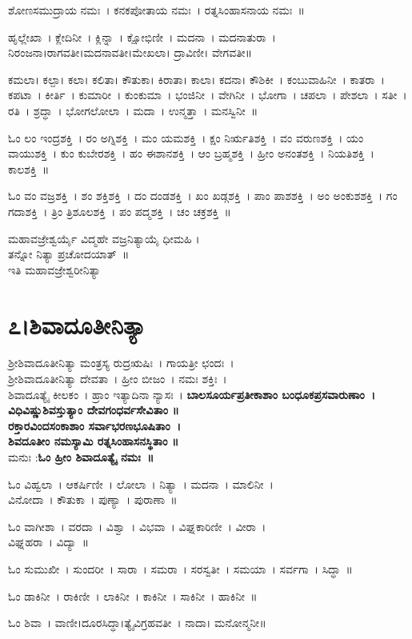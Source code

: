 ಶೋಣಸಮುದ್ರಾಯ ನಮಃ~। ಕನಕಪೋತಾಯ ನಮಃ~। ರತ್ನಸಿಂಹಾಸನಾಯ ನಮಃ~॥

ಹೃಲ್ಲೇಖಾ~। ಕ್ಲೇದಿನೀ~। ಕ್ಲಿನ್ನಾ~। ಕ್ಷೋಭಿಣೀ~। ಮದನಾ~। ಮದನಾತುರಾ~। \\ನಿರಂಜನಾ।ರಾಗವತೀ।ಮದನಾವತೀ।ಮೇಖಲಾ। ದ್ರಾವಿಣೀ। ವೇಗವತೀ॥ 

ಕಮಲಾ। ಕಲ್ಪಾ। ಕಲಾ। ಕಲಿತಾ। ಕೌತುಕಾ। ಕಿರಾತಾ। ಕಾಲಾ। ಕದನಾ। ಕೌಶಿಕೀ~। ಕಂಬುವಾಹಿನೀ~। ಕಾತರಾ~। ಕಪಟಾ~। ಕೀರ್ತಿ~। ಕುಮಾರೀ~। ಕುಂಕುಮಾ~। ಭಂಜಿನೀ~। ವೇಗಿನೀ~। ಭೋಗಾ~। ಚಪಲಾ~। ಪೇಶಲಾ~। ಸತೀ~। ರತಿ~। ಶ್ರದ್ಧಾ~। ಭೋಗಲೋಲಾ~। ಮದಾ~। ಉನ್ಮತ್ತಾ~। ಮನಸ್ವಿನೀ~॥ 

ಓಂ ಲಂ ಇಂದ್ರಶಕ್ತಿ~। ರಂ ಅಗ್ನಿಶಕ್ತಿ~। ಮಂ ಯಮಶಕ್ತಿ~। ಕ್ಷಂ ನಿರ್ಋತಿಶಕ್ತಿ~। ವಂ ವರುಣಶಕ್ತಿ~। ಯಂ ವಾಯುಶಕ್ತಿ~। ಕುಂ ಕುಬೇರಶಕ್ತಿ~। ಹಂ ಈಶಾನಶಕ್ತಿ~। ಆಂ ಬ್ರಹ್ಮಶಕ್ತಿ~। ಹ್ರೀಂ ಅನಂತಶಕ್ತಿ~। ನಿಯತಿಶಕ್ತಿ~। ಕಾಲಶಕ್ತಿ~॥

ಓಂ ವಂ ವಜ್ರಶಕ್ತಿ~। ಶಂ ಶಕ್ತಿಶಕ್ತಿ~। ದಂ ದಂಡಶಕ್ತಿ~। ಖಂ ಖಡ್ಗಶಕ್ತಿ~। ಪಾಂ ಪಾಶಶಕ್ತಿ~। ಅಂ ಅಂಕುಶಶಕ್ತಿ~। ಗಂ ಗದಾಶಕ್ತಿ~। ತ್ರಿಂ ತ್ರಿಶೂಲಶಕ್ತಿ~। ಪಂ ಪದ್ಮಶಕ್ತಿ~। ಚಂ ಚಕ್ರಶಕ್ತಿ~॥

ಮಹಾವಜ್ರೇಶ್ವರ್ಯೈ ವಿದ್ಮಹೇ ವಜ್ರನಿತ್ಯಾಯೈ ಧೀಮಹಿ ।\\ತನ್ನೋ ನಿತ್ಯಾ ಪ್ರಚೋದಯಾತ್~॥\\
ಇತಿ ಮಹಾವಜ್ರೇಶ್ವರೀನಿತ್ಯಾ
\section{೭।ಶಿವಾದೂತೀನಿತ್ಯಾ}
ಶ್ರೀಶಿವಾದೂತೀನಿತ್ಯಾ ಮಂತ್ರಸ್ಯ ರುದ್ರಋಷಿಃ~। ಗಾಯತ್ರೀ ಛಂದಃ~।\\ ಶ್ರೀಶಿವಾದೂತೀನಿತ್ಯಾ ದೇವತಾ~। ಹ್ರೀಂ ಬೀಜಂ~। ನಮಃ ಶಕ್ತಿಃ~।\\ ಶಿವಾದೂತ್ಯೈ ಕೀಲಕಂ~। ಹ್ರಾಂ ಇತ್ಯಾದಿನಾ ನ್ಯಾಸಃ~।
{\bfseries ಬಾಲಸೂರ್ಯಪ್ರತೀಕಾಶಾಂ ಬಂಧೂಕಪ್ರಸವಾರುಣಾಂ~।\\
ವಿಧಿವಿಷ್ಣುಶಿವಸ್ತುತ್ಯಾಂ ದೇವಗಂಧರ್ವಸೇವಿತಾಂ ॥\\
ರಕ್ತಾರವಿಂದಸಂಕಾಶಾಂ ಸರ್ವಾಭರಣಭೂಷಿತಾಂ~।\\
ಶಿವದೂತೀಂ ನಮಸ್ಯಾಮಿ ರತ್ನಸಿಂಹಾಸನಸ್ಥಿತಾಂ ॥\\}
ಮನುಃ :{\bfseries ಓಂ ಹ್ರೀಂ ಶಿವಾದೂತ್ಯೈ ನಮಃ~॥}

ಓಂ ವಿಹ್ವಲಾ~। ಆಕರ್ಷಿಣೀ~। ಲೋಲಾ~। ನಿತ್ಯಾ~। ಮದನಾ~। ಮಾಲಿನೀ~। \\ವಿನೋದಾ~। ಕೌತುಕಾ~। ಪುಣ್ಯಾ~। ಪುರಾಣಾ~॥ 

ಓಂ ವಾಗೀಶಾ~। ವರದಾ~। ವಿಶ್ವಾ~। ವಿಭವಾ~। ವಿಘ್ನಕಾರಿಣೀ~। ವೀರಾ~। \\ವಿಘ್ನಹರಾ~। ವಿದ್ಯಾ~॥ 

ಓಂ ಸುಮುಖೀ~। ಸುಂದರೀ~। ಸಾರಾ~। ಸಮರಾ~। ಸರಸ್ವತೀ~। ಸಮಯಾ~। ಸರ್ವಗಾ~। ಸಿದ್ಧಾ~॥ 

ಓಂ ಡಾಕಿನೀ~। ರಾಕಿಣೀ~। ಲಾಕಿನೀ~। ಕಾಕಿನೀ~। ಸಾಕಿನೀ~। ಹಾಕಿನೀ~॥ 

ಓಂ ಶಿವಾ~। ವಾಣೀ।ದೂರಸಿದ್ಧಾ।ತ್ಯೈವಿಗ್ರಹವತೀ~। ನಾದಾ। ಮನೋನ್ಮನೀ॥ 

